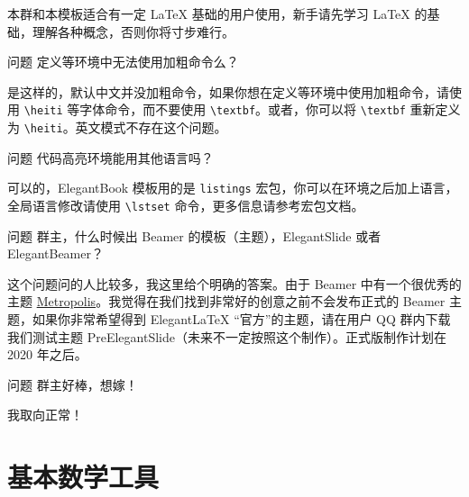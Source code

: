 \documentclass[cn,11pt]{elegantbook}
\begin{document}
\begin{solution}
本群和本模板适合有一定 \LaTeX{} 基础的用户使用，新手请先学习 \LaTeX{} 的基础，理解各种概念，否则你将寸步难行。
\end{solution}

\begin{custom}{问题}
定义等环境中无法使用加粗命令么？
\end{custom}

\begin{solution}
是这样的，默认中文并没加粗命令，如果你想在定义等环境中使用加粗命令，请使用 \lstinline{\heiti} 等字体命令，而不要使用 \lstinline{\textbf}。或者，你可以将 \lstinline{\textbf} 重新定义为 \lstinline{\heiti}。英文模式不存在这个问题。
\end{solution}

\begin{custom}{问题}
代码高亮环境能用其他语言吗？
\end{custom}

\begin{solution}
可以的，ElegantBook 模板用的是 \lstinline{listings} 宏包，你可以在环境之后加上语言，全局语言修改请使用 \lstinline{\lstset} 命令，更多信息请参考宏包文档。
\end{solution}


\begin{custom}{问题}
群主，什么时候出 Beamer 的模板（主题），ElegantSlide 或者 ElegantBeamer？
\end{custom}

\begin{solution}
这个问题问的人比较多，我这里给个明确的答案。由于 Beamer 中有一个很优秀的主题 \href{https://github.com/matze/mtheme}{Metropolis}。我觉得在我们找到非常好的创意之前不会发布正式的 Beamer 主题，如果你非常希望得到 Elegant\LaTeX{} “官方”的主题，请在用户 QQ 群内下载我们测试主题 PreElegantSlide（未来不一定按照这个制作）。正式版制作计划在 2020 年之后。
\end{solution}

\begin{custom}{问题}
群主好棒，想嫁！
\end{custom}

\begin{solution}
我取向正常！
\end{solution}


\nocite{*} 



\appendix
\chapter{基本数学工具}
\end{document}
